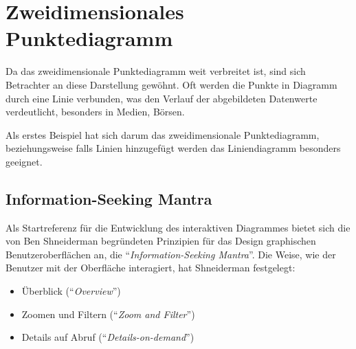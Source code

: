 \section{Zweidimensionales Punktediagramm}

Da das zweidimensionale Punktediagramm weit verbreitet ist, sind sich Betrachter an diese Darstellung gewöhnt. Oft werden die Punkte in Diagramm durch eine Linie verbunden, was den Verlauf der abgebildeten Datenwerte verdeutlicht, besonders in Medien, Börsen. 

Als erstes Beispiel hat sich darum das zweidimensionale Punktediagramm, beziehungsweise falls Linien hinzugefügt werden das Liniendiagramm besonders geeignet.

\subsection{Information-Seeking Mantra}

Als Startreferenz für die Entwicklung des interaktiven Diagrammes bietet sich die von Ben Shneiderman begründeten Prinzipien für das Design graphischen Benutzeroberflächen an, die "`\textit{Information-Seeking Mantra}"'. Die Weise, wie der Benutzer mit der Oberfläche interagiert, hat Shneiderman \cite{shneiderman} festgelegt:

\begin{itemize}
	\item Überblick ("`\textit{Overview}"')
	\item Zoomen und Filtern ("`\textit{Zoom and Filter}"')
	\item Details auf Abruf ("`\textit{Details-on-demand}"')
\end{itemize}

